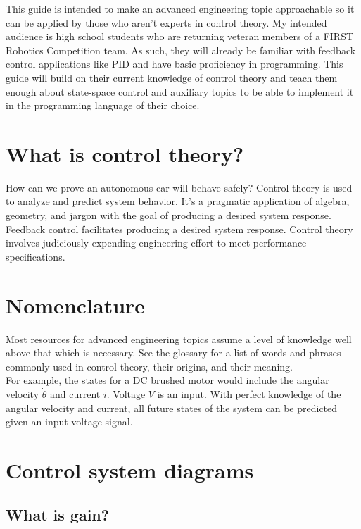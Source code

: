\documentclass[10pt,conference,compsoc]{IEEEtran}
\begin{document}
This guide is intended to make an advanced engineering topic approachable so it
can be applied by those who aren't experts in control theory. My intended
audience is high school students who are returning veteran members of a FIRST
Robotics Competition team. As such, they will already be familiar with feedback
control applications like PID and have basic proficiency in programming. This
guide will build on their current knowledge of control theory and teach them
enough about state-space control and auxiliary topics to be able to implement it
in the programming language of their choice.

\section{What is control theory?}

How can we prove an autonomous car will behave safely? Control theory is used to
analyze and predict \gls{system} behavior. It's a pragmatic application of
algebra, geometry, and jargon with the goal of producing a desired \gls{system}
response. Feedback control facilitates producing a desired \gls{system}
response. Control theory involves judiciously expending engineering effort to
meet performance specifications.

\section{Nomenclature}

Most resources for advanced engineering topics assume a level of knowledge well
above that which is necessary. See the glossary for a list of words and phrases
commonly used in control theory, their origins, and their meaning. \\

For example, the \glspl{state} for a DC brushed motor would include the angular
velocity $\dot{\theta}$ and current $i$. Voltage $V$ is an input. With perfect
knowledge of the angular velocity and current, all future \glspl{state} of the
\gls{system} can be predicted given an input voltage signal.

\section{Control system diagrams}

\subsection{What is gain?}
\end{document}
